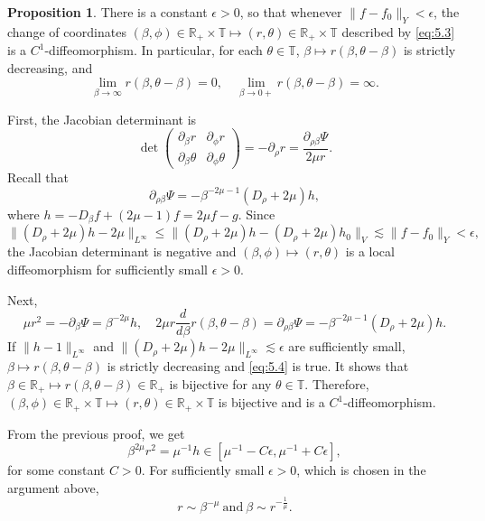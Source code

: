\documentclass[11pt]{article}
\makeatletter
\renewenvironment{proof}[1][\proofname]{\par
  \vspace{-.7\topsep}%
  \pushQED{\qed}%
  \normalfont
  \topsep0pt \partopsep0pt %
  \trivlist
  \item[\hskip\labelsep
        \itshape
    #1\@addpunct{.}]\ignorespaces
}{%
  \popQED\endtrivlist\@endpefalse
  \addvspace{6pt plus 6pt} %
}
\theoremstyle{definition}
\newtheorem{prop}[theorem]{Proposition}
\theoremstyle{remark}
\numberwithin{equation}{section}
\newcommand{\mbb}{\mathbb}
\newcommand{\R}{\mbb{R}}
\newcommand{\del}{\partial}
\newcommand{\norm}[1]{\lVert #1 \rVert}
\makeatother
\begin{document}
\begin{prop}
There is a constant $\epsilon > 0$, so that whenever $\norm{f - f_0}_Y < \epsilon$, the change of coordinates $(\beta, \phi) \in \R_+ \times \mbb{T} \mapsto (r,\theta) \in \R_+ \times \mbb{T}$ described by \eqref{eq:5.3} is a $C^1$-diffeomorphism. In particular, for each $\theta\in\mbb{T}$, $\beta \mapsto r(\beta, \theta-\beta)$ is strictly decreasing, and
\begin{equation} \label{eq:5.4}
\lim_{\beta \to \infty} r(\beta, \theta-\beta) = 0, \quad \lim_{\beta \to 0+} r(\beta, \theta-\beta) = \infty.
\end{equation}
\end{prop}
\begin{proof}
First, the Jacobian determinant is
\begin{equation} \label{eq:5.5}
\det \begin{pmatrix} \del_\beta r & \del_\phi r \\ \del_\beta \theta & \del_\phi \theta \end{pmatrix} = - \del_\rho r = \frac{\del_{\rho\beta}\Psi}{2\mu r}.
\end{equation}
Recall that
\[\del_{\rho\beta}\Psi = - \beta^{-2\mu - 1} (D_\rho + 2\mu)h,\]
where $h = -D_\beta f + (2\mu - 1)f = 2\mu f - g$. Since
\[\norm{(D_\rho + 2\mu)h - 2\mu}_{L^\infty} \leq \norm{(D_\rho + 2\mu)h - (D_\rho + 2\mu)h_0}_V \lesssim \norm{f - f_0}_Y < \epsilon,\]
the Jacobian determinant is negative and $(\beta, \phi) \mapsto (r,\theta)$ is a local diffeomorphism for sufficiently small $\epsilon > 0$.

Next,
\[\mu r^2 = -\del_\beta \Psi = \beta^{-2\mu} h, \quad 2\mu r \frac{d}{d\beta}r(\beta,\theta-\beta) = \del_{\rho\beta} \Psi = -\beta^{-2\mu - 1} (D_\rho + 2\mu)h.\]
If $\norm{h - 1}_{L^\infty}$ and $\norm{(D_\rho + 2\mu)h - 2\mu}_{L^\infty} \lesssim \epsilon$ are sufficiently small, $\beta \mapsto r(\beta, \theta-\beta)$ is strictly decreasing and \eqref{eq:5.4} is true. It shows that $\beta \in \R_+ \mapsto r(\beta, \theta-\beta) \in \R_+$ is bijective for any $\theta\in \mbb{T}$. Therefore, $(\beta, \phi) \in \R_+ \times \mbb{T} \mapsto (r,\theta) \in \R_+ \times \mbb{T}$ is bijective and is a $C^1$-diffeomorphism.
\end{proof}

From the previous proof, we get
\[\beta^{2\mu} r^2 = \mu^{-1} h \in [\mu^{-1} - C\epsilon, \mu^{-1} +C\epsilon],\]
for some constant $C>0$. For sufficiently small $\epsilon > 0$, which is chosen in the argument above,
\[r \sim \beta^{-\mu}~\text{and}~\beta \sim r^{-\frac{1}{\mu}}.\]
\end{document}

